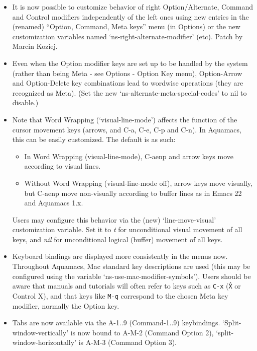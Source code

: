 \begin{itemize}


\item It is now possible to customize behavior of right Option/Alternate, Command and Control modifiers independently of the left ones using new entries in the (renamed) ``Option, Command, Meta keys'' menu (in Options) or the new customization variables named `ns-right-alternate-modifier' (etc).
Patch by Marcin Koziej.

\item Even when the Option modifier keys are set up to be handled by the system (rather than being Meta - see Options - Option Key menu), Option-Arrow and Option-Delete key combinations lead to wordwise operations (they are recognized as Meta).  (Set the new `ns-alternate-meta-special-codes'  to nil to disable.)

\item Note that Word Wrapping (`visual-line-mode') affects the function of the cursor movement keys (arrows, and C-a, C-e, C-p and C-n).  In Aquamacs, this can be easily customized.  The default is as such:
\begin{itemize}
\item In Word Wrapping (visual-line-mode), C-aenp and arrow keys move according to visual lines.
\item Without Word Wrapping (visual-line-mode off), arrow keys move visually, but C-aenp move non-visually according to buffer lines as in Emacs 22 and Aquamacs 1.x.
\end{itemize}
Users may configure this behavior via the (new) `line-move-visual' customization variable.  Set it to \emph{t} for unconditional visual movement of all keys, and \emph{nil} for unconditional logical (buffer) movement of all keys.

\item Keyboard bindings are displayed more consistently in the menus now.  Throughout Aquamacs,  Mac standard key descriptions are used (this may be configured using the variable `ns-use-mac-modifier-symbols').  Users should be aware that manuals and tutorials will often refer to keys such as {\tt C-x} ({\tt \^X} or Control X), and that keys like {\tt M-q} correspond to the chosen Meta key modifier, normally the Option key.

\item Tabs are now available via the A-1..9 (Command-1..9) keybindings.  `Split-window-vertically' is now bound to A-M-2 (Command Option 2), `split-window-horizontally' is A-M-3 (Command Option 3).


\end{itemize}
